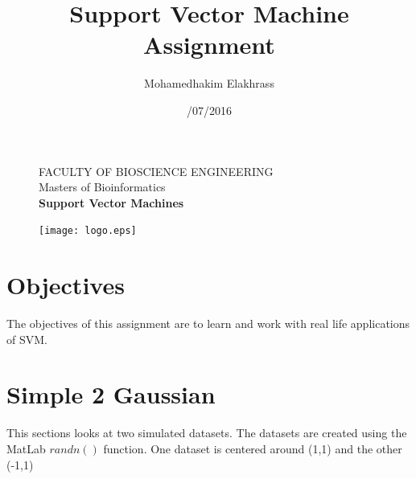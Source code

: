\documentclass[11pt,oneside,a4paper]{article}
\title{\vspace*{40.0mm}
  \bf\sf Support Vector Machine Assignment 
         \vspace*{20.0mm} \\
  \vspace*{40.0mm}
  }
\author{\sf Mohamedhakim Elakhrass}
\date{\sf 15/07/2016}
\makeatletter
\def\cleardoublepage{\clearpage\if@twoside \ifodd\c@page\else%
\hbox{}%
\thispagestyle{empty}%
\clearpage%
\if@twocolumn\hbox{}\clearpage\fi\fi\fi}
\makeatother
\begin{document}
\begin{figure}
  \parbox[t]{125mm}{
    \vspace*{6mm}
    \scriptsize\sf           FACULTY OF BIOSCIENCE ENGINEERING\\
    \scriptsize\sf           Masters of Bioinformatics \\
    \scriptsize\sf\bfseries  Support Vector Machines \\}
  \parbox[t]{40mm}{
    \begin{flushright}
      \texttt{[image: logo.eps]}
    \end{flushright}}
\end{figure}

\maketitle
\thispagestyle{empty}
\raggedbottom

\cleardoublepage
{}
\setcounter{tocdepth}{2}
\tableofcontents
\cleardoublepage
{}

\cleardoublepage

\section{Objectives}
The objectives of this assignment are to learn and work with real life applications of SVM. 
\section{Simple 2 Gaussian}
This sections looks at two simulated datasets. The datasets are created using the MatLab $randn()$ function. One dataset is centered around (1,1) and the other (-1,1)\\
\end{document}
